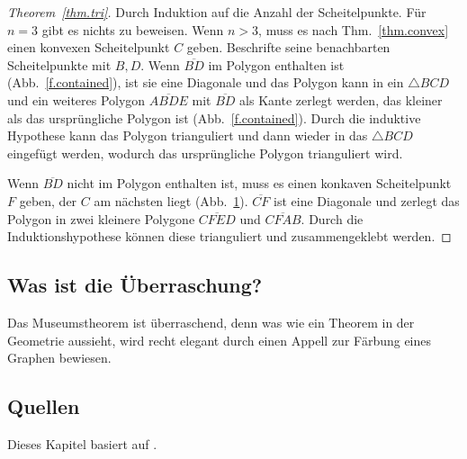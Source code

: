 \begin{proof}[Theorem~\ref{thm.tri}]
Durch Induktion auf die Anzahl der Scheitelpunkte. Für $n=3$ gibt es nichts zu beweisen. Wenn $n>3$, muss es nach Thm.~\ref{thm.convex} einen konvexen Scheitelpunkt $C$ geben. Beschrifte seine benachbarten Scheitelpunkte mit $B,D$. Wenn $\overline{BD}$ im Polygon enthalten ist (Abb.~\ref{f.contained}), ist sie eine Diagonale und das Polygon kann in ein $\triangle BCD$ und ein weiteres Polygon $\overline{ABDE}$ mit $\overline{BD}$ als Kante zerlegt werden, das kleiner als das ursprüngliche Polygon ist (Abb.~\ref{f.contained}). Durch die induktive Hypothese kann das Polygon trianguliert und dann wieder in das $\triangle BCD$ eingefügt werden, wodurch das ursprüngliche Polygon trianguliert wird.

\begin{figure}[t]
\subfigures
{}
\label{f.contained}
\label{f.museum.concave-vertices}
\end{figure}
Wenn $\overline{BD}$ nicht im Polygon enthalten ist, muss es einen konkaven Scheitelpunkt $F$ geben, der $C$ am nächsten liegt (Abb.~\ref{f.museum.concave-vertices}). $\overline{CF}$ ist eine Diagonale und zerlegt das Polygon in zwei kleinere Polygone $\overline{CFED}$ und $\overline{CFAB}$. Durch die Induktionshypothese können diese trianguliert und zusammengeklebt werden.
\end{proof}

\newpage

\subsection*{Was ist die Überraschung?}
Das Museumstheorem ist überraschend, denn was wie ein Theorem in der Geometrie aussieht, wird recht elegant durch einen Appell zur Färbung eines Graphen bewiesen.

\subsection*{Quellen}

Dieses Kapitel basiert auf \cite[Chap.~39]{thebook}.
